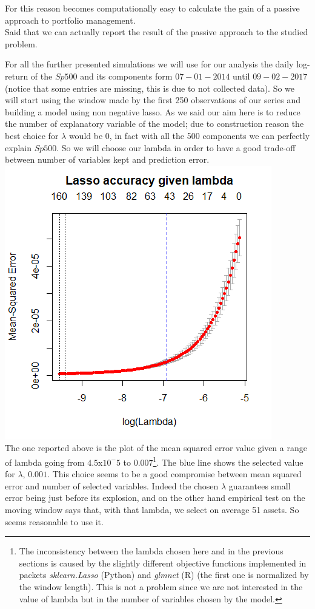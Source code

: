 \documentclass{article}%
\begin{document}
For this reason becomes computationally easy to calculate the gain of a passive approach to portfolio management. 
\\

Said that we can actually report the result of the passive approach to the studied problem.

For all the further presented simulations we will use for our analysis the daily log-return of the $Sp500$ and its components form $07-01-2014$ until $09-02-2017$ (notice that some entries are missing, this is due to not collected data). So we will start using the window made by the first 250 observations of our series and building a model using non negative lasso. As we said our aim here is to reduce the number of explanatory variable of the model; due to construction reason the best choice for $\lambda$ would be 0, in fact with all the 500 components we can perfectly explain $Sp500$. So we will choose our lambda in order to have a good trade-off between number of variables kept and prediction error. 
\\


\includegraphics[scale=0.75]{lassoplot}
\\

The one reported above is the plot of the mean squared error value given a range of lambda going from $4.5$x$10^-5$ to $0.007$\footnote{The inconsistency between the lambda chosen here and in the previous sections is caused by the slightly different objective functions implemented in packets \textit{sklearn.Lasso} (Python) and  \textit{glmnet} (R) (the first one is normalized by the window length). This is not a problem since we are not interested in the value of lambda but in the number of variables chosen by the model.}. The blue line shows the selected value for $\lambda$, $0.001$. This choice seems to be a good compromise between mean squared error and number of selected variables. Indeed the chosen $\lambda$	guarantees small error being just before its explosion, and on the other hand empirical test on the moving window says that, with that lambda, we select on average 51 assets. So seems reasonable to use it. 
\end{document}
